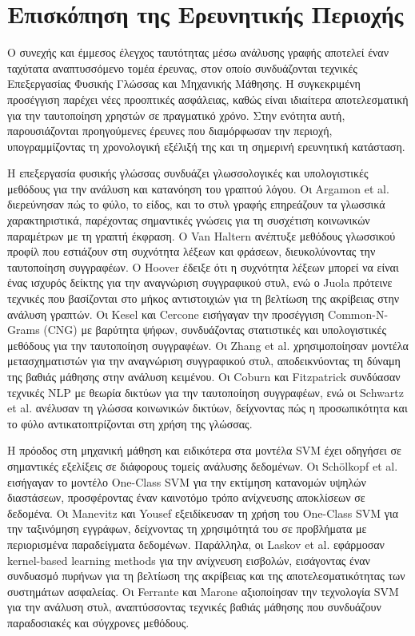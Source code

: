 \chapter{Επισκόπηση της Ερευνητικής Περιοχής}
\label{chapter:sota}

Ο συνεχής και έμμεσος έλεγχος ταυτότητας μέσω ανάλυσης γραφής αποτελεί έναν ταχύτατα αναπτυσσόμενο τομέα έρευνας, στον οποίο συνδυάζονται τεχνικές Επεξεργασίας Φυσικής Γλώσσας και Μηχανικής Μάθησης. Η συγκεκριμένη προσέγγιση παρέχει νέες προοπτικές ασφάλειας, καθώς είναι ιδιαίτερα αποτελεσματική για την ταυτοποίηση χρηστών σε πραγματικό χρόνο. Στην ενότητα αυτή, παρουσιάζονται προηγούμενες έρευνες που διαμόρφωσαν την περιοχή, υπογραμμίζοντας τη χρονολογική εξέλιξή της και τη σημερινή ερευνητική κατάσταση.

Η επεξεργασία φυσικής γλώσσας συνδυάζει γλωσσολογικές και υπολογιστικές μεθόδους για την ανάλυση και κατανόηση του γραπτού λόγου. Οι Argamon et al. \cite{argamon2003linguistic} διερεύνησαν πώς το φύλο, το είδος, και το στυλ γραφής επηρεάζουν τα γλωσσικά χαρακτηριστικά, παρέχοντας σημαντικές γνώσεις για τη συσχέτιση κοινωνικών παραμέτρων με τη γραπτή έκφραση. Ο Van Haltern \cite{vanhaltern2003profiling} ανέπτυξε μεθόδους γλωσσικού προφίλ που εστιάζουν στη συχνότητα λέξεων και φράσεων, διευκολύνοντας την ταυτοποίηση συγγραφέων. Ο Hoover \cite{hoover2002wordfreq} έδειξε ότι η συχνότητα λέξεων μπορεί να είναι ένας ισχυρός δείκτης για την αναγνώριση συγγραφικού στυλ, ενώ ο Juola \cite{juola2008matchlength} πρότεινε τεχνικές που βασίζονται στο μήκος αντιστοιχιών για τη βελτίωση της ακρίβειας στην ανάλυση γραπτών. Οι Kesel και Cercone \cite{kesel2010cng} εισήγαγαν την προσέγγιση Common-N-Grams (CNG) με βαρύτητα ψήφων, συνδυάζοντας στατιστικές και υπολογιστικές μεθόδους για την ταυτοποίηση συγγραφέων. Οι Zhang et al. \cite{zhang2021bert} χρησιμοποίησαν μοντέλα μετασχηματιστών για την αναγνώριση συγγραφικού στυλ, αποδεικνύοντας τη δύναμη της βαθιάς μάθησης στην ανάλυση κειμένου. Οι Coburn και Fitzpatrick \cite{coburn2020contextual} συνδύασαν τεχνικές NLP με θεωρία δικτύων για την ταυτοποίηση συγγραφέων, ενώ οι Schwartz et al. \cite{schwartz2013authorship} ανέλυσαν τη γλώσσα κοινωνικών δικτύων, δείχνοντας πώς η προσωπικότητα και το φύλο αντικατοπτρίζονται στη χρήση της γλώσσας.

Η πρόοδος στη μηχανική μάθηση και ειδικότερα στα μοντέλα SVM έχει οδηγήσει σε σημαντικές εξελίξεις σε διάφορους τομείς ανάλυσης δεδομένων. Οι Schölkopf et al. \cite{scholkopf2001ocsvm} εισήγαγαν το μοντέλο One-Class SVM για την εκτίμηση κατανομών υψηλών διαστάσεων, προσφέροντας έναν καινοτόμο τρόπο ανίχνευσης αποκλίσεων σε δεδομένα. Οι Manevitz και Yousef \cite{manevitz2002oneclass} εξειδίκευσαν τη χρήση του One-Class SVM για την ταξινόμηση εγγράφων, δείχνοντας τη χρησιμότητά του σε προβλήματα με περιορισμένα παραδείγματα δεδομένων. Παράλληλα, οι Laskov et al. \cite{laskov2004intrusion} εφάρμοσαν kernel-based learning methods για την ανίχνευση εισβολών, εισάγοντας έναν συνδυασμό πυρήνων για τη βελτίωση της ακρίβειας και της αποτελεσματικότητας των συστημάτων ασφαλείας. Οι Ferrante και Marone \cite{ferrante2022stylometric} αξιοποίησαν την τεχνολογία SVM για την ανάλυση στυλ, αναπτύσσοντας τεχνικές βαθιάς μάθησης που συνδυάζουν παραδοσιακές και σύγχρονες μεθόδους. 

